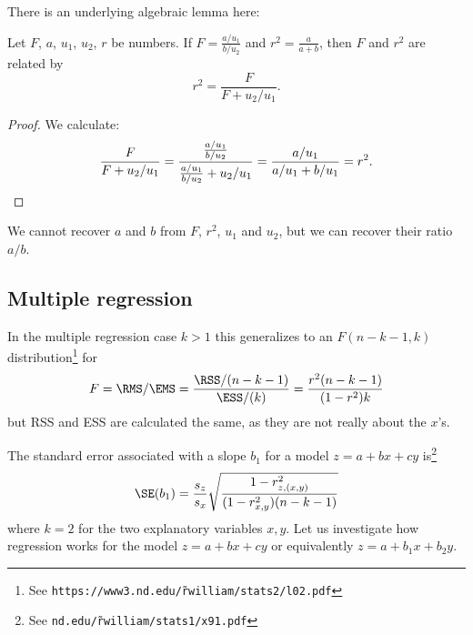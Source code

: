 There is an underlying algebraic lemma here:
\begin{lem}
Let $F$, $a$, $u_1$, $u_2$, $r$ be numbers.
If $F=\frac{a/u_1}{b/u_2}$ and $r^2=\frac{a}{a+b}$, then $F$ and $r^2$ are related by
\[
	r^2 = \frac{F}{F+u_2/u_1}.
\]
\end{lem}
\begin{proof}
We calculate:
\[
	\frac{F}{F+u_2/u_1} = \frac{\frac{a/u_1}{b/u_2}}{\frac{a/u_1}{b/u_2} + u_2/u_1} = \frac{a/u_1}{a/u_1+b/u_1}=r^2.\qedhere
\]
\end{proof}


We cannot recover $a$ and $b$ from $F$, $r^2$, $u_1$ and $u_2$, but we can recover their ratio $a/b$.





\subsection{Multiple regression}
In the multiple regression case $k>1$
this generalizes to an $F(n-k-1, k)$ distribution\footnote{See \texttt{https://www3.nd.edu/\~rwilliam/stats2/l02.pdf}} for 
\[
	F
	= \RMS/\EMS
	= \frac{\RSS/(n-k-1)}{\ESS/(k)}
	= \frac{r^2(n-k-1)}{(1-r^2)k}
\]
but RSS and ESS are calculated the same, as they are not really about the $x$'s.

The standard error associated with a slope $b_1$ for a model $z=a+bx+cy$ is\footnote{See \texttt{nd.edu/\~rwilliam/stats1/x91.pdf}}
\[
	\SE(b_1) = \frac{s_z}{s_x} \sqrt{\frac{1-r^2_{z,(x,y)}}{(1-r^2_{x,y})(n-k-1)}}
\]
where $k=2$ for the two explanatory variables $x,y$.
Let us investigate how regression works for the model $z=a+bx+cy$ or equivalently $z=a+b_1x+b_2y$.

